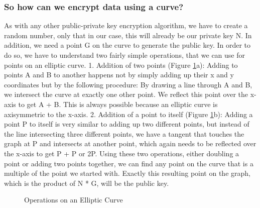 \subsubsection{So how can we encrypt data using a curve?}
As with any other public-private key encryption algorithm, we have to create a random number, only that in our case, this will already be our private key N. In addition, we need a point G on the curve to generate the public key. In order to do so, we have to understand two fairly simple operations, that we can use for points on an elliptic curve.
1. Addition of two points (Figure \ref{ec2}a): Adding to points A and B to another happens not by simply adding up their x and y coordinates but by the following procedure: By drawing a line through A and B, we intersect the curve at exactly one other point. We reflect this point over the x-axis to get A + B. This is always possible because an elliptic curve is axisymmetric to the x-axis.
2. Addition of a point to itself (Figure \ref{ec2}b): Adding a point P to itself is very similar to adding up two different points, but instead of the line intersecting three different points, we have a tangent that touches the graph at P and intersects at another point, which again needs to be reflected over the x-axis to get P + P or 2P.
Using these two operations, either doubling a point or adding two points together, we can find any point on the curve that is a multiple of the point we started with. Exactly this resulting point on the graph, which is the product of N * G, will be the public key.

\begin{figure}%
    \centering
    \qquad
\caption{Operations on an Elliptic Curve}%
\label{ec2}
\end{figure}

